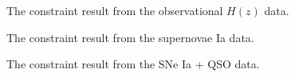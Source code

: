 \documentclass[twocolumn]{aastex631}
\begin{document}
   \begin{figure}[htbp]
      \centering
      \caption{The constraint result from the observational
      $H(z)$ data.}
      \label{fig:1}
   \end{figure}

   \begin{figure}[htbp]
      \centering
      \caption{The constraint result from the supernovae
      Ia data.}
   \end{figure}

   \begin{figure}[htbp]
      \centering
      \caption{The constraint result from the SNe Ia + QSO data.}
   \end{figure}
\end{document}
